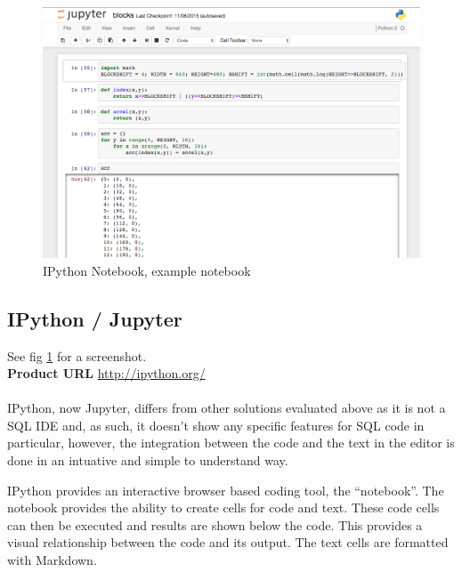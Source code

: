 \begin{figure}
  \includegraphics[width=\linewidth]{Figures/ipython.png}
  \caption{IPython Notebook, example notebook}
  \label{fig:ipythonnotebook}
\end{figure}

\subsection{IPython / Jupyter}\label{ipython-jupyter}

\noindent
See fig \ref{fig:ipythonnotebook} for a screenshot.
\noindent\\
\textbf{Product URL}\cite{PER-GRA:2007}
\url{http://ipython.org/}
\\
\\
\noindent
IPython, now Jupyter, differs from other solutions evaluated above as it is not
a SQL IDE and, as such, it doesn't show any specific features for SQL code in
particular, however, the integration between the code and the text in the editor
is done in an intuative and simple to understand way.

IPython provides an interactive browser based coding tool, the ``notebook''. The
notebook provides the ability to create cells for code and text. These code cells
can then be executed and results are shown below the code. This provides a
visual relationship between the code and its output. The text cells are
formatted with Markdown\cite{wiki:markdown}.

